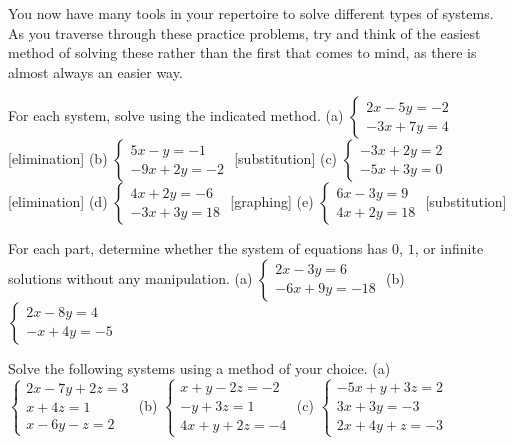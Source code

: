 \documentclass[../book.tex]{subfiles}
\begin{document}
You now have many tools in your repertoire to solve different types of systems.  As you traverse through these practice problems, try and think of the easiest method of solving these rather than the first that comes to mind, as there is almost always an easier way.
\begin{reviewset}
\item For each system, solve using the indicated method.  \newline 
(a) $\begin{cases} 2x-5y=-2 \\ -3x+7y=4\end{cases}$ [elimination] 
(b) $\begin{cases} 5x-y=-1 \\ -9x+2y=-2\end{cases}$ [substitution] \newline 
(c) $\begin{cases} -3x+2y=2 \\ -5x+3y=0\end{cases}$ [elimination]\hspace{19mm}
(d) $\begin{cases} 4x+2y=-6 \\ -3x+3y=18\end{cases}$ [graphing]\newline 
(e) $\begin{cases} 6x-3y=9 \\ 4x+2y=18\end{cases}$ [substitution]
\item For each part, determine whether the system of equations has $0$, $1$, or infinite solutions without any manipulation.  \newline 
(a) $\begin{cases} 2x-3y=6 \\ -6x+9y=-18 \end{cases}$ \hspace{50mm} (b) $\begin{cases} 2x-8y=4 \\ -x+4y=-5 \end{cases}$ \newline
\item Solve the following systems using a method of your choice.  \newline 
(a) $\begin{cases} 2x-7y+2z=3 \\ x+4z=1 \\ x-6y-z=2\end{cases}$ \hspace{5mm} (b) $\begin{cases} x+y-2z=-2 \\ -y+3z=1 \\ 4x+y+2z=-4\end{cases}$ \hspace{5mm} (c) $\begin{cases} -5x+y+3z=2 \\ 3x+3y=-3 \\ 2x+4y+z=-3\end{cases}$ \newline

\end{reviewset}
\end{document}
